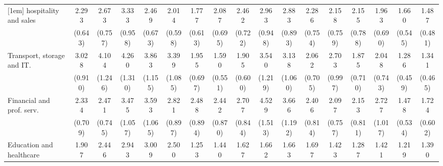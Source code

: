 {\begin{tabular}{l*{16}{c}}
[1em]
hospitality and sales&       2.293\sym{**} &       2.673\sym{***}&       3.333\sym{***}&       2.469\sym{***}&       2.014\sym{*}  &       1.777         &       2.087\sym{*}  &       2.462\sym{**} &       2.963\sym{***}&       2.883\sym{***}&       2.286\sym{*}  &       2.158\sym{*}  &       2.155\sym{*}  &       1.963         &       1.660         &       1.487         \\
                    &     (0.643)         &     (0.757)         &     (0.958)         &     (0.673)         &     (0.598)         &     (0.613)         &     (0.695)         &     (0.722)         &     (0.948)         &     (0.893)         &     (0.754)         &     (0.759)         &     (0.788)         &     (0.690)         &     (0.545)         &     (0.481)         \\
[1em]
Transport, storage and IT.&       3.028\sym{***}&       4.104\sym{***}&       4.260\sym{***}&       3.863\sym{***}&       3.399\sym{***}&       1.955         &       1.590         &       1.905\sym{*}  &       3.540\sym{***}&       3.138\sym{***}&       2.062\sym{*}  &       2.703\sym{**} &       1.875         &       2.048\sym{*}  &       1.286         &       1.341         \\
                    &     (0.910)         &     (1.246)         &     (1.310)         &     (1.155)         &     (1.085)         &     (0.697)         &     (0.551)         &     (0.600)         &     (1.219)         &     (1.060)         &     (0.705)         &     (0.997)         &     (0.710)         &     (0.743)         &     (0.459)         &     (0.465)         \\
[1em]
Financial and prof. serv.&       2.334\sym{**} &       2.471\sym{**} &       3.475\sym{***}&       3.593\sym{***}&       2.821\sym{**} &       2.488\sym{*}  &       2.442\sym{*}  &       2.707\sym{**} &       4.529\sym{***}&       3.666\sym{***}&       2.406\sym{**} &       2.097\sym{*}  &       2.153\sym{*}  &       2.727\sym{**} &       1.478         &       1.724         \\
                    &     (0.709)         &     (0.745)         &     (1.057)         &     (1.065)         &     (0.897)         &     (0.894)         &     (0.870)         &     (0.844)         &     (1.513)         &     (1.192)         &     (0.814)         &     (0.757)         &     (0.811)         &     (1.017)         &     (0.534)         &     (0.602)         \\
[1em]
Education and healthcare&       1.907         &       2.446\sym{**} &       2.943\sym{**} &       3.009\sym{**} &       2.500\sym{*}  &       1.253         &       1.440         &       1.627         &       1.662         &       1.663         &       1.697         &       1.423         &       1.287         &       1.421         &       1.219         &       1.390         \\

\end{tabular}}
